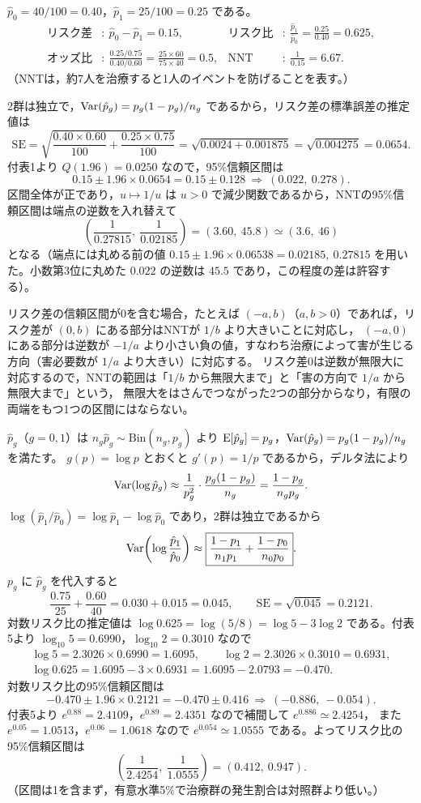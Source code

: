\documentclass[a4paper,11pt]{ltjsarticle}
\begin{document}
$\hat p_0=40/100=0.40$，$\hat p_1=25/100=0.25$ である。
\begin{align*}
\text{リスク差}&:\ \hat p_0-\hat p_1=\boxed{0.15},&
\text{リスク比}&:\ \frac{\hat p_1}{\hat p_0}=\frac{0.25}{0.40}=\boxed{0.625},\\
\text{オッズ比}&:\ \frac{0.25/0.75}{0.40/0.60}=\frac{25\times60}{75\times40}=\boxed{0.5},&
\text{NNT}&:\ \frac{1}{0.15}=\boxed{6.67}.
\end{align*}
（NNTは，約7人を治療すると1人のイベントを防げることを表す。）

2群は独立で，$\operatorname{Var}(\hat p_g)=p_g(1-p_g)/n_g$ であるから，リスク差の標準誤差の推定値は
\[
\mathrm{SE}=\sqrt{\frac{0.40\times0.60}{100}+\frac{0.25\times0.75}{100}}=\sqrt{0.0024+0.001875}=\sqrt{0.004275}=\boxed{0.0654}.
\]
付表1より $Q(1.96)=0.0250$ なので，95\%信頼区間は
\[
0.15\pm1.96\times0.0654=0.15\pm0.128\ \Longrightarrow\ \boxed{(0.022,\ 0.278)}.
\]
区間全体が正であり，$u\mapsto1/u$ は $u>0$ で減少関数であるから，NNTの95\%信頼区間は端点の逆数を入れ替えて
\[
\left(\frac{1}{0.27815},\ \frac{1}{0.02185}\right)=(3.60,\ 45.8)\simeq\boxed{(3.6,\ 46)}
\]
となる（端点には丸める前の値 $0.15\pm1.96\times0.06538=0.02185,\ 0.27815$ を用いた。小数第3位に丸めた $0.022$ の逆数は $45.5$ であり，この程度の差は許容する）。

リスク差の信頼区間が0を含む場合，たとえば $(-a,b)$（$a,b>0$）であれば，リスク差が $(0,b)$ にある部分はNNTが $1/b$ より大きいことに対応し，
$(-a,0)$ にある部分は逆数が $-1/a$ より小さい負の値，すなわち治療によって害が生じる方向（害必要数が $1/a$ より大きい）に対応する。
リスク差0は逆数が無限大に対応するので，NNTの範囲は「$1/b$ から無限大まで」と「害の方向で $1/a$ から無限大まで」という，
無限大をはさんでつながった2つの部分からなり，有限の両端をもつ1つの区間にはならない。

$\hat p_g$（$g=0,1$）は $n_g\hat p_g\sim\mathrm{Bin}(n_g,p_g)$ より $\operatorname{E}[\hat p_g]=p_g$，$\operatorname{Var}(\hat p_g)=p_g(1-p_g)/n_g$ を満たす。
$g(p)=\log p$ とおくと $g'(p)=1/p$ であるから，デルタ法により
\[
\operatorname{Var}(\log\hat p_g)\approx\frac{1}{p_g^2}\cdot\frac{p_g(1-p_g)}{n_g}=\frac{1-p_g}{n_gp_g}.
\]
$\log(\hat p_1/\hat p_0)=\log\hat p_1-\log\hat p_0$ であり，2群は独立であるから
\[
\operatorname{Var}\!\left(\log\frac{\hat p_1}{\hat p_0}\right)\approx\boxed{\frac{1-p_1}{n_1p_1}+\frac{1-p_0}{n_0p_0}}.
\]
$p_g$ に $\hat p_g$ を代入すると
\[
\frac{0.75}{25}+\frac{0.60}{40}=0.030+0.015=0.045,\qquad \mathrm{SE}=\sqrt{0.045}=0.2121 .
\]
対数リスク比の推定値は $\log0.625=\log(5/8)=\log5-3\log2$ である。付表5より $\log_{10}5=0.6990$，$\log_{10}2=0.3010$ なので
\begin{gather*}
\log5=2.3026\times0.6990=1.6095,\qquad\log2=2.3026\times0.3010=0.6931,\\
\log0.625=1.6095-3\times0.6931=1.6095-2.0793=-0.470 .
\end{gather*}
対数リスク比の95\%信頼区間は
\[
-0.470\pm1.96\times0.2121=-0.470\pm0.416\ \Longrightarrow\ (-0.886,\ -0.054).
\]
付表5より $e^{0.88}=2.4109$，$e^{0.89}=2.4351$ なので補間して $e^{0.886}\simeq2.4254$，
また $e^{0.05}=1.0513$，$e^{0.06}=1.0618$ なので $e^{0.054}\simeq1.0555$ である。よってリスク比の95\%信頼区間は
\[
\left(\frac{1}{2.4254},\ \frac{1}{1.0555}\right)=\boxed{(0.412,\ 0.947)}.
\]
（区間は1を含まず，有意水準5\%で治療群の発生割合は対照群より低い。）
\end{document}
